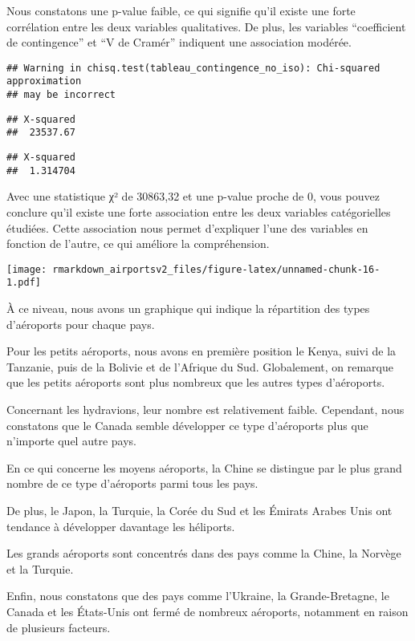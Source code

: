 \documentclass[
]{compterendu}
\begin{document}
Nous constatons une p-value faible, ce qui signifie qu'il existe une
forte corrélation entre les deux variables qualitatives. De plus, les
variables ``coefficient de contingence'' et ``V de Cramér'' indiquent
une association modérée.

\begin{verbatim}
## Warning in chisq.test(tableau_contingence_no_iso): Chi-squared approximation
## may be incorrect
\end{verbatim}

\begin{verbatim}
## X-squared 
##  23537.67
\end{verbatim}

\begin{verbatim}
## X-squared 
##  1.314704
\end{verbatim}

Avec une statistique χ² de 30863,32 et une p-value proche de 0, vous
pouvez conclure qu'il existe une forte association entre les deux
variables catégorielles étudiées. Cette association nous permet
d'expliquer l'une des variables en fonction de l'autre, ce qui améliore
la compréhension.

\texttt{[image: rmarkdown\_airportsv2\_files/figure-latex/unnamed-chunk-16-1.pdf]}

À ce niveau, nous avons un graphique qui indique la répartition des
types d'aéroports pour chaque pays.

Pour les petits aéroports, nous avons en première position le Kenya,
suivi de la Tanzanie, puis de la Bolivie et de l'Afrique du Sud.
Globalement, on remarque que les petits aéroports sont plus nombreux que
les autres types d'aéroports.

Concernant les hydravions, leur nombre est relativement faible.
Cependant, nous constatons que le Canada semble développer ce type
d'aéroports plus que n'importe quel autre pays.

En ce qui concerne les moyens aéroports, la Chine se distingue par le
plus grand nombre de ce type d'aéroports parmi tous les pays.

De plus, le Japon, la Turquie, la Corée du Sud et les Émirats Arabes
Unis ont tendance à développer davantage les héliports.

Les grands aéroports sont concentrés dans des pays comme la Chine, la
Norvège et la Turquie.

Enfin, nous constatons que des pays comme l'Ukraine, la Grande-Bretagne,
le Canada et les États-Unis ont fermé de nombreux aéroports, notamment
en raison de plusieurs facteurs.
\end{document}
